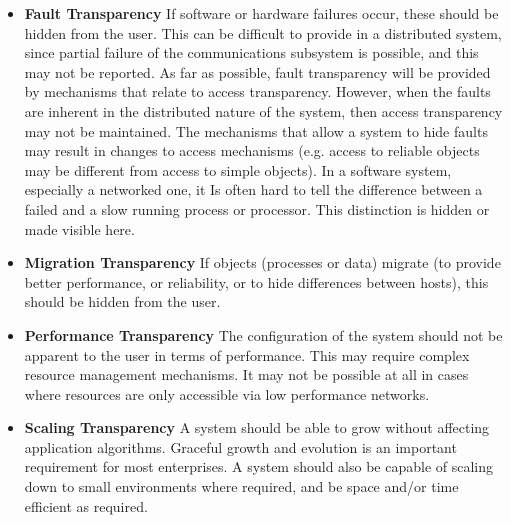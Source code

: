 \begin{itemize}
     \item  \textbf{Fault Transparency} If software or hardware failures occur, these should be hidden from the user. This can be difficult to provide in a distributed system, since partial failure of the communications subsystem is possible, and this may not be reported. As far as possible, fault transparency will be provided by mechanisms that relate to access transparency. However, when the faults are inherent in the distributed nature of the system, then access transparency may not be maintained. The mechanisms that allow a system to hide faults may result in changes to access mechanisms (e.g. access to reliable objects may be different from access to simple objects). In a software system, especially a networked one, it Is often hard to tell the difference between a failed and a slow running process or processor. This distinction is hidden or made visible here. 
     \item  \textbf{Migration Transparency} If objects (processes or data) migrate (to provide better performance, or reliability, or to hide differences between hosts), this should be hidden from the user. 
     \item  \textbf{Performance Transparency} The configuration of the system should not be apparent to the user in terms of performance. This may require complex resource management mechanisms. It may not be possible at all in cases where resources are only accessible via low performance networks. 
     \item  \textbf{Scaling Transparency} A system should be able to grow without affecting application algorithms. Graceful growth and evolution is an important requirement for most enterprises. A system should also be capable of scaling down to small environments where required, and be space and/or time efficient as required. 
 \end{itemize}